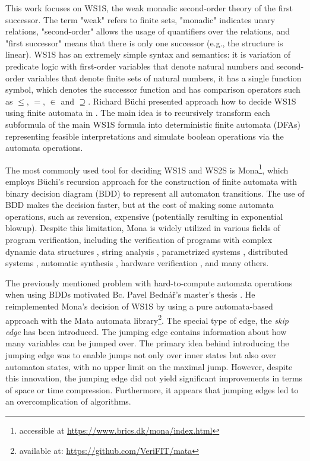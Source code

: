 \documentclass[pdflatex,sn-mathphys-num]{sn-jnl}%
\theoremstyle{thmstyleone}%
\theoremstyle{thmstyletwo}%
\theoremstyle{thmstylethree}%
\begin{document}
    This work focuses on WS1S, the weak monadic second-order theory of the first successor. The term "weak" refers to finite sets, "monadic" indicates unary relations, "second-order" allows the usage of quantifiers over the relations, and "first successor" means that there is only one successor (e.g., the structure is linear).  WS1S \cite{WS1S} has an extremely simple syntax and semantics: it is variation of predicate logic with first-order variables that denote natural numbers and second-order variables that denote finite sets of natural numbers, it has a single function symbol, which denotes the successor function and has comparison operators such as $\leq$, $=$, $\in$ and $\supseteq$. Richard Büchi presented approach how to decide WS1S using finite automata in \cite{Buchi}. The main idea is to recursively transform each subformula of the main WS1S formula into deterministic finite automata (DFAs) representing feasible interpretations and simulate boolean operations via the automata operations.

    The most commonly used tool for deciding WS1S and WS2S is Mona\footnote{accessible at \url{https://www.brics.dk/mona/index.html}}, which employs Büchi's recursion approach for the construction of finite automata with binary decision diagram (BDD) to represent all automaton transitions. The use of BDD makes the decision faster, but at the cost of making some automata operations, such as reversion, expensive (potentially resulting in exponential blowup). Despite this limitation, Mona is widely utilized in various fields of program verification, including the verification of programs with complex dynamic data structures \cite{DDS1, DDS2}, string analysis \cite{string_analysis}, parametrized systems \cite{parametrized_systems}, distributed systems \cite{distributed_systems}, automatic synthesis \cite{automatic_synthesis}, hardware verification \cite{hardware_verification}, and many others.

    The previously mentioned problem with hard-to-compute automata operations when using BDDs motivated Bc. Pavel Bednář's master's thesis \cite{Bednar}. He reimplemented Mona's decision of WS1S by using a pure automata-based approach with the Mata automata library\footnote{available at: \url{https://github.com/VeriFIT/mata}}. The special type of edge, the \textit{skip edge} has been introduced. The jumping edge contains information about how many variables can be jumped over. The primary idea behind introducing the jumping edge was to enable jumps not only over inner states but also over automaton states, with no upper limit on the maximal jump. However, despite this innovation, the jumping edge did not yield significant improvements in terms of space or time compression. Furthermore, it appears that jumping edges led to an overcomplication of algorithms.
\end{document}
